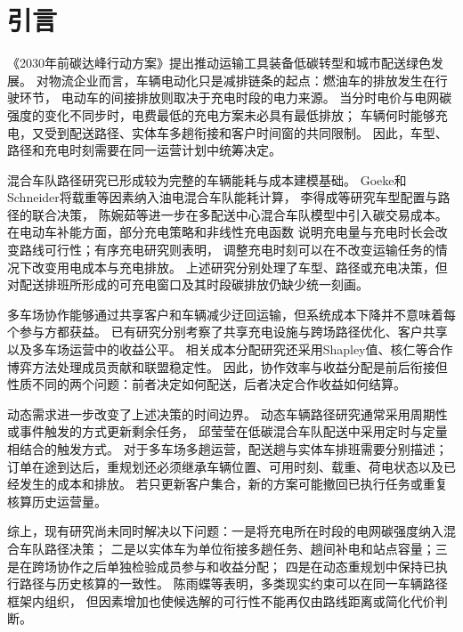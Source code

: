 \documentclass{setp-new}
\begin{document}
\maketitle
\clearpage

\section{引言}

《2030年前碳达峰行动方案》提出推动运输工具装备低碳转型和城市配送绿色发展\cite{ref:55}。
对物流企业而言，车辆电动化只是减排链条的起点：燃油车的排放发生在行驶环节，
电动车的间接排放则取决于充电时段的电力来源。
当分时电价与电网碳强度的变化不同步时，电费最低的充电方案未必具有最低排放；
车辆何时能够充电，又受到配送路径、实体车多趟衔接和客户时间窗的共同限制。
因此，车型、路径和充电时刻需要在同一运营计划中统筹决定。

混合车队路径研究已形成较为完整的车辆能耗与成本建模基础。
Goeke和Schneider\cite{ref:27}将载重等因素纳入油电混合车队能耗计算，
李得成等\cite{ref:6}研究车型配置与路径的联合决策，
陈婉茹等\cite{ref:23}进一步在多配送中心混合车队模型中引入碳交易成本。
在电动车补能方面，部分充电策略\cite{ref:45}和非线性充电函数\cite{ref:46}
说明充电量与充电时长会改变路线可行性；有序充电研究则表明，
调整充电时刻可以在不改变运输任务的情况下改变用电成本与充电排放\cite{ref:50,ref:52}。
上述研究分别处理了车型、路径或充电决策，但对配送排班所形成的可充电窗口及其时段碳排放仍缺少统一刻画。

多车场协作能够通过共享客户和车辆减少迂回运输，但系统成本下降并不意味着每个参与方都获益。
已有研究分别考察了共享充电设施与跨场路径优化\cite{ref:7,ref:25}、客户共享\cite{ref:49}
以及多车场运营中的收益公平\cite{ref:8}。
相关成本分配研究还采用Shapley值、核仁等合作博弈方法处理成员贡献和联盟稳定性\cite{ref:9,ref:91,ref:92}。
因此，协作效率与收益分配是前后衔接但性质不同的两个问题：前者决定如何配送，后者决定合作收益如何结算。

动态需求进一步改变了上述决策的时间边界。
动态车辆路径研究通常采用周期性或事件触发的方式更新剩余任务\cite{ref:14,ref:18}，
邱莹莹\cite{ref:71}在低碳混合车队配送中采用定时与定量相结合的触发方式。
对于多车场多趟运营，配送趟与实体车排班需要分别描述\cite{ref:44}；
订单在途到达后，重规划还必须继承车辆位置、可用时刻、载重、荷电状态以及已经发生的成本和排放。
若只更新客户集合，新的方案可能撤回已执行任务或重复核算历史运营量。

综上，现有研究尚未同时解决以下问题：一是将充电所在时段的电网碳强度纳入混合车队路径决策；
二是以实体车为单位衔接多趟任务、趟间补电和站点容量；三是在跨场协作之后单独检验成员参与和收益分配；
四是在动态重规划中保持已执行路径与历史核算的一致性。
陈雨蝶等\cite{ref:48}表明，多类现实约束可以在同一车辆路径框架内组织，
但因素增加也使候选解的可行性不能再仅由路线距离或简化代价判断。
\end{document}
